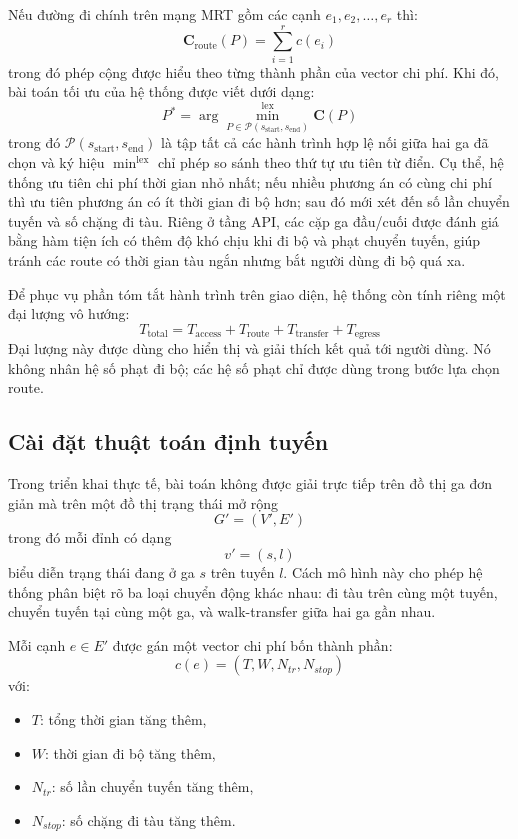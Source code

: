 \documentclass[../DoAn.tex]{subfiles}
\begin{document}
Nếu đường đi chính trên mạng MRT gồm các cạnh $e_1, e_2, \dots, e_r$ thì:
\[
\mathbf{C}_{\text{route}}(P) = \sum_{i=1}^{r} c(e_i)
\]
trong đó phép cộng được hiểu theo từng thành phần của vector chi phí. Khi đó, bài toán tối ưu của hệ thống được viết dưới dạng:
\[
P^{*} = \arg\min_{P \in \mathcal{P}(s_{\text{start}}, s_{\text{end}})}^{\text{lex}} \mathbf{C}(P)
\]
trong đó $\mathcal{P}(s_{\text{start}}, s_{\text{end}})$ là tập tất cả các hành trình hợp lệ nối giữa hai ga đã chọn và ký hiệu $\min^{\text{lex}}$ chỉ phép so sánh theo thứ tự ưu tiên từ điển. Cụ thể, hệ thống ưu tiên chi phí thời gian nhỏ nhất; nếu nhiều phương án có cùng chi phí thì ưu tiên phương án có ít thời gian đi bộ hơn; sau đó mới xét đến số lần chuyển tuyến và số chặng đi tàu. Riêng ở tầng API, các cặp ga đầu/cuối được đánh giá bằng hàm tiện ích có thêm độ khó chịu khi đi bộ và phạt chuyển tuyến, giúp tránh các route có thời gian tàu ngắn nhưng bắt người dùng đi bộ quá xa.

Để phục vụ phần tóm tắt hành trình trên giao diện, hệ thống còn tính riêng một đại lượng vô hướng:
\[
T_{\text{total}} = T_{\text{access}} + T_{\text{route}} + T_{\text{transfer}} + T_{\text{egress}}
\]
Đại lượng này được dùng cho hiển thị và giải thích kết quả tới người dùng. Nó không nhân hệ số phạt đi bộ; các hệ số phạt chỉ được dùng trong bước lựa chọn route.

\subsection{Cài đặt thuật toán định tuyến}

Trong triển khai thực tế, bài toán không được giải trực tiếp trên đồ thị ga đơn giản mà trên một đồ thị trạng thái mở rộng
\[
G' = (V', E')
\]
trong đó mỗi đỉnh có dạng
\[
v' = (s, l)
\]
biểu diễn trạng thái đang ở ga \(s\) trên tuyến \(l\). Cách mô hình này cho phép hệ thống phân biệt rõ ba loại chuyển động khác nhau: đi tàu trên cùng một tuyến, chuyển tuyến tại cùng một ga, và walk-transfer giữa hai ga gần nhau.

Mỗi cạnh \(e \in E'\) được gán một vector chi phí bốn thành phần:
\[
c(e) = (T, W, N_{tr}, N_{stop})
\]
với:
\begin{itemize}
    \item \(T\): tổng thời gian tăng thêm,
    \item \(W\): thời gian đi bộ tăng thêm,
    \item \(N_{tr}\): số lần chuyển tuyến tăng thêm,
    \item \(N_{stop}\): số chặng đi tàu tăng thêm.
\end{itemize}
\end{document}
